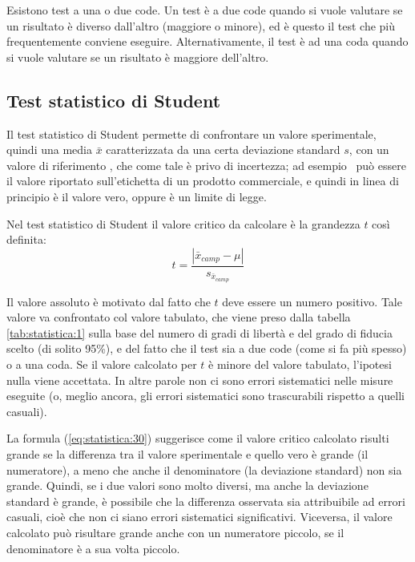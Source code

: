 Esistono test a una o due code. Un test è a due code quando si vuole valutare se un risultato è diverso dall'altro (maggiore o minore), ed è questo il test che più frequentemente conviene eseguire. Alternativamente, il test è ad una coda quando si vuole valutare se un risultato è maggiore dell'altro.

\subsection{Test statistico di Student}

Il test statistico di Student permette di confrontare un valore sperimentale, quindi una media $\bar{x}$ caratterizzata da una certa deviazione standard $s$, con un valore di riferimento \mu, che come tale è privo di incertezza; ad esempio \mu\ può essere il valore riportato sull'etichetta di un prodotto commerciale, e quindi in linea di principio è il valore vero, oppure è un limite di legge.

Nel test statistico di Student il valore critico da calcolare è la grandezza $t$ così definita:
\begin{equation} \label{eq:statistica:30}
t = \frac{|\bar{x}_{camp} - \mu|}{s_{\bar{x}_{camp}}}
\end{equation}

Il valore assoluto è motivato dal fatto che $t$ deve essere un numero positivo. Tale valore va confrontato col valore tabulato, che viene preso dalla tabella \ref{tab:statistica:1} sulla base del numero di gradi di libertà e del grado di fiducia scelto (di solito 95\%), e del fatto che il test sia a due code (come si fa più spesso) o a una coda. Se il valore calcolato per $t$ è minore del valore tabulato, l'ipotesi nulla viene accettata. In altre parole non ci sono errori sistematici nelle misure eseguite (o, meglio ancora, gli errori sistematici sono trascurabili rispetto a quelli casuali).

La formula (\ref{eq:statistica:30}) suggerisce come il valore critico calcolato risulti grande se la differenza tra il valore sperimentale e quello vero è grande (il numeratore), a meno che anche il denominatore (la deviazione standard) non sia grande. Quindi, se i due valori sono molto diversi, ma anche la deviazione standard è grande, è possibile che la differenza osservata sia attribuibile ad errori casuali, cioè che non ci siano errori sistematici significativi. Viceversa, il valore calcolato può risultare grande anche con un numeratore piccolo, se il denominatore è a sua volta piccolo.

